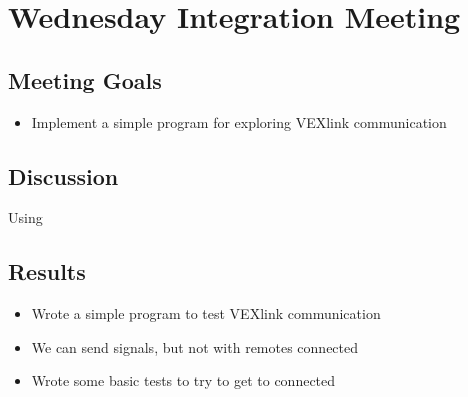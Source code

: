 \section{Wednesday Integration Meeting}

\subsection{Meeting Goals}
\begin{itemize}
    \item Implement a simple program for exploring VEXlink communication
\end{itemize}

\subsection{Discussion}
Using 

\subsection{Results}
\begin{itemize}
    \item Wrote a simple program to test VEXlink communication
    \item We can send signals, but not with remotes connected
    \item Wrote some basic tests to try to get to connected
\end{itemize}
